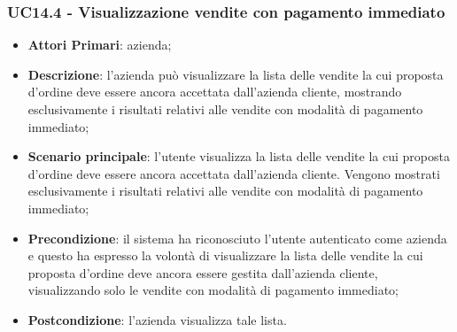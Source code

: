 
\subsubsection{UC14.4 - Visualizzazione vendite con pagamento immediato}
\begin{itemize}
	\item \textbf{Attori Primari}: azienda;
	\item \textbf{Descrizione}: l'azienda può visualizzare la lista delle vendite la cui proposta d'ordine deve essere ancora accettata dall'azienda cliente, mostrando esclusivamente i risultati relativi alle vendite con modalità di pagamento immediato;
	\item \textbf{Scenario principale}: l'utente visualizza la lista delle vendite la cui proposta d'ordine deve essere ancora accettata dall'azienda cliente. Vengono mostrati esclusivamente i risultati relativi alle vendite con modalità di pagamento immediato;
	\item \textbf{Precondizione}: il sistema ha riconosciuto l'utente autenticato come azienda e questo ha espresso la volontà di visualizzare la lista delle vendite la cui proposta d'ordine deve ancora essere gestita dall'azienda cliente, visualizzando solo le vendite con modalità di pagamento immediato;
	\item \textbf{Postcondizione}: l'azienda visualizza tale lista.
\end{itemize}


